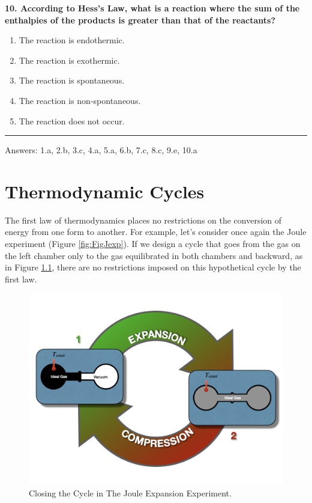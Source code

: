 \documentclass[
  9pt,
]{extbook}
\providecommand{\tightlist}{%
  \setlength{\itemsep}{0pt}\setlength{\parskip}{0pt}}
\theoremstyle{definition}
\theoremstyle{definition}
\theoremstyle{definition}
\theoremstyle{remark}
\begin{document}
\textbf{10. According to Hess's Law, what is a reaction where the sum of the enthalpies of the products is greater than that of the reactants?}

\begin{enumerate}
\def\labelenumi{\alph{enumi}.}
\tightlist
\item
  The reaction is endothermic.
\item
  The reaction is exothermic.
\item
  The reaction is spontaneous.
\item
  The reaction is non-spontaneous.
\item
  The reaction does not occur.
\end{enumerate}

\begin{center}\rule{0.5\linewidth}{0.5pt}\end{center}

Answers: 1.a, 2.b, 3.c, 4.a, 5.a, 6.b, 7.c, 8.c, 9.e, 10.a

\hypertarget{ThermodynamicCycles}{%
\chapter{Thermodynamic Cycles}\label{ThermodynamicCycles}}

The first law of thermodynamics places no restrictions on the conversion of energy from one form to another. For example, let's consider once again the Joule experiment (Figure \ref{fig:FigJexp}). If we design a cycle that goes from the gas on the left chamber only to the gas equilibrated in both chambers and backward, as in Figure \ref{fig:FigJexpC}, there are no restrictions imposed on this hypothetical cycle by the first law.

\begin{figure}

{\centering \includegraphics[width=0.8\linewidth]{./img/OEP_Figures.008} 

}

\caption{Closing the Cycle in The Joule Expansion Experiment.}\label{fig:FigJexpC}
\end{figure}
\end{document}
